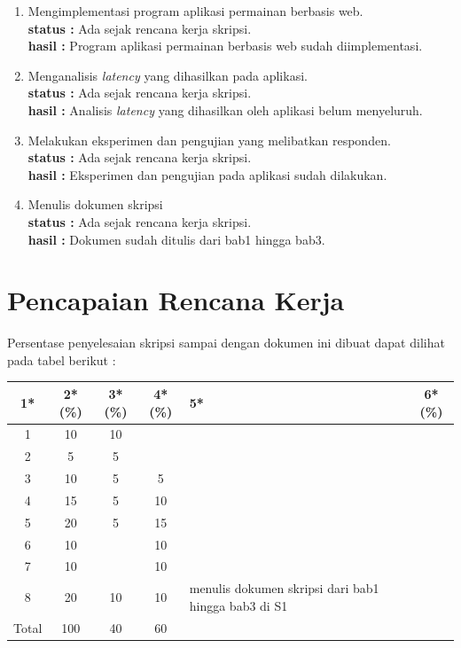 \documentclass[a4paper,twoside]{article}
\begin{document}
\begin{enumerate}
		\item Mengimplementasi program aplikasi permainan berbasis web. \\
		{\bf status :} Ada sejak rencana kerja skripsi.\\
		{\bf hasil :} Program aplikasi permainan berbasis web sudah diimplementasi.
		

		\item Menganalisis \textit{latency} yang dihasilkan pada aplikasi.\\
		{\bf status :} Ada sejak rencana kerja skripsi.\\
		{\bf hasil :} Analisis \textit{latency} yang dihasilkan oleh aplikasi belum menyeluruh.

		\item Melakukan eksperimen dan pengujian yang melibatkan responden.\\
		{\bf status :} Ada sejak rencana kerja skripsi.\\
		{\bf hasil :} Eksperimen dan pengujian pada aplikasi sudah dilakukan.

		\item Menulis dokumen skripsi\\
		{\bf status :} Ada sejak rencana kerja skripsi.\\
		{\bf hasil :} Dokumen sudah ditulis dari bab1 hingga bab3.
		

	\end{enumerate}

%


\section{Pencapaian Rencana Kerja}
Persentase penyelesaian skripsi sampai dengan dokumen ini dibuat dapat dilihat pada tabel berikut :

\begin{center}
  \begin{tabular}{ | c | c | c | c | l | c |}
    \hline
    1*  & 2*(\%) & 3*(\%) & 4*(\%) &5* &6*(\%)\\ \hline \hline
    1   & 10  & 10  &  &  & \\ \hline
    2   & 5 & 5  &   &  &  \\ \hline
    3   & 10  & 5  & 5 &  &  \\ \hline
    4   & 15  & 5  &  10 & &  \\ \hline
    5   & 20  & 5  & 15 & &  \\ \hline
    6   & 10 &   & 10  &  & \\\hline
    7   & 10  &   & 10 &  &  \\ \hline
    8   & 20  & 10 & 10  & {\footnotesize menulis dokumen skripsi dari bab1 hingga bab3 di S1}  & \\ \hline
    Total  & 100  & 40  & 60 &  & \\ \hline
                          \end{tabular}
\end{center}
\end{document}
